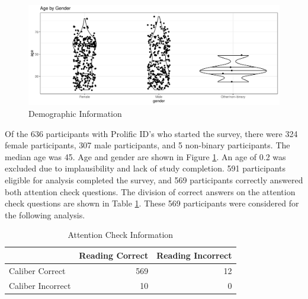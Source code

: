 \documentclass[print]{nuthesis}
\begin{document}
\begin{figure}

{\centering \includegraphics[width=\linewidth]{thesis_files/figure-latex/demographics-1} 

}

\caption{Demographic Information}\label{fig:demographics}
\end{figure}

Of the 636 participants with Prolific ID's who started the survey, there were 324 female participants, 307 male participants, and 5 non-binary participants.
The median age was 45.
Age and gender are shown in Figure \ref{fig:demographics}.
An age of 0.2 was excluded due to implausibility and lack of study completion.
591 participants eligible for analysis completed the survey, and 569 participants correctly answered both attention check questions.
The division of correct answers on the attention check questions are shown in Table \ref{tab:attentioncheck}.
These 569 participants were considered for the following analysis.

\begin{table}

\caption{\label{tab:attentioncheck}Attention Check Information}
\centering
\begin{tabular}[t]{l|r|r}
\hline
  & Reading Correct & Reading Incorrect\\
\hline
Caliber Correct & 569 & 12\\
\hline
Caliber Incorrect & 10 & 0\\
\hline
\end{tabular}
\end{table}
\end{document}
